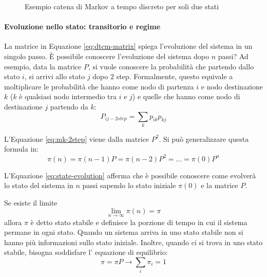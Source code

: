 \documentclass{article}
\begin{document}
\begin{figure}
  \centering
  \caption{Esempio catena di Markov a tempo discreto per soli due stati}
  \label{fig:dtcm-ex}
\end{figure}

\paragraph{Evoluzione nello stato: transitorio e regime} La matrice in Equazione
\ref{eq:dtcm-matrix} spiega l'evoluzione del sistema in un singolo passo. È possibile
conoscere l'evoluzione del sistema dopo $n$ passi? Ad esempio, data la matrice $P$, si vuole
conoscere la probabilità che partendo dallo stato $i$, si arrivi allo stato $j$ dopo $2$
step. Formalmente, questo equivale a moltiplicare le probabilità che hanno come nodo di 
partenza $i$ e nodo destinazione $k$ ($k$ è qualsiasi nodo intermedio tra $i$ e $j$) e
quelle che hanno come nodo di destinazione $j$ partendo da $k$:
\begin{equation}
  P_{ij-2step} = \sum_k p_{ik}p_{kj}
  \label{eq:mk-2step}
\end{equation}

L'Equazione \ref{eq:mk-2step} viene dalla matrice $P^2$. Si può generalizzare questa
formula in:
\begin{equation}
  \pi(n) = \pi(n-1)P = \pi(n-2)P^2 = \dots = \pi(0)P^n
  \label{eq:state-evolution}
\end{equation}

L'Equazione \ref{eq:state-evolution} afferma che è possibile conoscere come evolverà lo stato 
del sistema in $n$ passi sapendo lo stato iniziale $\pi(0)$ e la matrice $P$.

Se esiste il limite
\[
  \lim_{n\to \infty}\pi(n) = \pi  
\]
allora $\pi$ è detto stato stabile e definisce la porzione di tempo in cui il sistema permane 
in ogni stato. Quando un sistema arriva in uno stato stabile non si hanno più informazioni 
sullo stato iniziale. Inoltre, quando ci si trova in uno stato stabile, bisogna soddisfare l'
equazione di equilibrio:
\begin{equation}
  \pi = \pi P \to \sum_i\pi_i = 1
  \label{eq:steady-state}
\end{equation}
\end{document}
